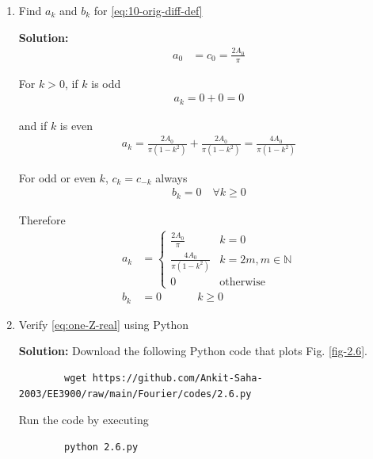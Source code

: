 \documentclass[journal,12pt,twocolumn]{IEEEtran}
\newcommand{\solution}{\noindent \textbf{Solution: }}
\numberwithin{equation}{section}
\numberwithin{figure}{section}
\renewcommand\thesection{\arabic{section}}
\begin{document}
\begin{enumerate}[label=\thesection.\arabic*,ref=\thesection.\theenumi]
	\item Find $a_k$ and $b_k$ for \eqref{eq:10-orig-diff-def}
	
	\solution 
	\begin{align}
		a_0 &= c_0 = \frac{2A_0}{\pi} 
	\end{align}
	
	For $k > 0$, if $k$ is odd
	\begin{align}
		a_k = 0 + 0 = 0
	\end{align}
	
	and if $k$ is even
	\begin{align}
		a_k = \frac{2A_0}{\pi(1-k^2)} + \frac{2A_0}{\pi(1-k^2)} = \frac{4A_0}{\pi(1-k^2)}
	\end{align}
	
	For odd or even $k$, $c_k = c_{-k}$ always
	\begin{align}
		b_k = 0 \quad \forall k \ge 0
	\end{align}
	
	Therefore
	\begin{align}
		a_k &=
		\begin{cases}
			\frac{2A_0}{\pi} & k = 0 \\
			\frac{4A_0}{\pi(1-k^2)} & k = 2m, m \in \mathbb{N} \\
			0 & \text{otherwise}
		\end{cases} \\
		b_k &= 0 \qquad \quad ~ k \ge 0
	\end{align}
	
	\item Verify \eqref{eq:one-Z-real} using Python
	
	\solution Download the following Python code that plots Fig. \ref{fig-2.6}.
	\begin{lstlisting}
		wget https://github.com/Ankit-Saha-2003/EE3900/raw/main/Fourier/codes/2.6.py
	\end{lstlisting}
	
	Run the code by executing
	\begin{lstlisting}
		python 2.6.py
	\end{lstlisting}


\end{enumerate}
\end{document}
